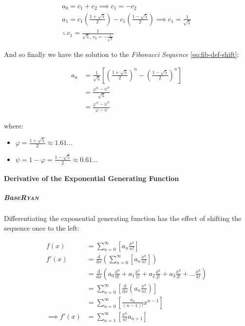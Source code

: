 \documentclass[a4paper,11pt,twoside]{article}
\begin{document}
\begin{align*}
a_0= c_1 +  c_2  \implies  c_1= - c_2\\
a_1= c_1 \left( \frac{1+ \sqrt{5} }{2} \right) -  c_1 \left( \frac{1-\sqrt{5} }{2} \right)  \implies  c_1 = \frac{1}{\sqrt{5} }\\
\therefore ~ c_1 = \frac{1}{\sqrt{5}, ~ c_2 = -\frac{1}{\sqrt{5}}}
\end{align*}


And so finally we have the solution to the \emph{Fibonacci Sequence} \ref{eq:fib-def-shift}:


\begin{align}
    a_n &= \frac{1}{\sqrt{5} } \left[ \left( \frac{1+  \sqrt{5} }{2}  \right)^n -  \left( \frac{1- \sqrt{5} }{2} \right)^n \right] \nonumber \\
&= \frac{\varphi^n - \psi^n}{\sqrt{5} } \nonumber\\
&=\frac{\varphi^n -  \psi^n}{\varphi - \psi} \label{eq:fib-sol}
\end{align}


where:

\begin{itemize}
\item \(\varphi = \frac{1+ \sqrt{5} }{2} \approx 1.61\ldots\)
\item \(\psi = 1-\varphi = \frac{1- \sqrt{5} }{2} \approx 0.61\ldots\)
\end{itemize}

\paragraph{Derivative of the Exponential Generating Function}
\label{Derivative-exp-gen-function}
\subparagraph{Base\hfill{}\textsc{Ryan}}
\label{sec:orgf1fb9de}
Differentiating the exponential generating function has the effect of shifting the sequence once to the left: \cite{lehmanReadingsMathematicsComputer2010}

\begin{align}
    f\left( x \right) &= \sum^{\infty}_{n= 0}   \left[ a_n \frac{x^n}{n!} \right] \label{eq:exp-pow-series} \\
f'\left( x \right) &= \frac{\mathrm{d} }{\mathrm{d} x}\left( \sum^{\infty}_{n= 0}   \left[ a_n \frac{x^n}{n!} \right]  \right) \nonumber \\
&= \frac{\mathrm{d}}{\mathrm{d} x} \left( a_0 \frac{x^0}{0!} +  a_1 \frac{x^1}{1!} +  a_2 \frac{x^2}{2!}+  a_3 \frac{x^3}{3! } +  \ldots \frac{x^k}{k!} \right) \nonumber \\
&= \sum^{\infty}_{n= 0}   \left[ \frac{\mathrm{d} }{\mathrm{d} x}\left( a_n \frac{x^n}{n!} \right) \right] \nonumber \\
&= \sum^{\infty}_{n= 0}   {\left[{ \frac{a_n}{{\left({ n- 1 }\right)!}} } x^{n- 1}  \right]} \nonumber \\
\implies f'(x) &= \sum^{\infty}_{n= 1}   {\left[{ \frac{x^n}{n!}a_{n+  1} }\right]} \label{eq:exp-pow-series-sol}
\end{align}
\end{document}
